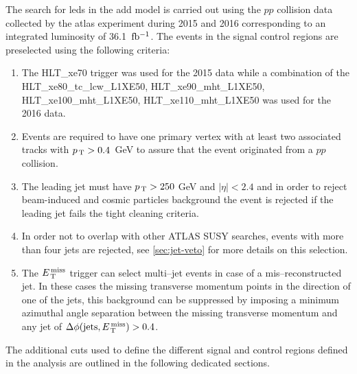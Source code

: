 The search for \glspl{led} in the \gls{add} model is carried out using the $pp$
collision data collected by the \gls{atlas} experiment during 2015 and 2016
corresponding to an integrated luminosity of 36.1~$\mbox{fb$^{-1}$}$. The events in the
signal control regions are preselected using the following criteria:
\begin{enumerate}[A -]
\item The HLT\_xe70 trigger was used for the 2015 data while a combination of
  the HLT\_xe80\_tc\_lcw\_L1XE50, HLT\_xe90\_mht\_L1XE50,
  HLT\_xe100\_mht\_L1XE50, HLT\_xe110\_mht\_L1XE50 was used for the 2016 data.
\item Events are required to have one primary vertex with at least two
  associated tracks with $p_\mathrm{\, T} > 0.4$~GeV to assure that the event originated
  from a $pp$ collision.
\item The leading jet must have $p_\mathrm{\, T} > 250~$GeV and $|\eta| < 2.4$ and in
  order to reject beam-induced and cosmic particles background the event is
  rejected if the leading jet fails the tight cleaning criteria.
\item In order not to overlap with other ATLAS SUSY searches, events with more
  than four jets are rejected, see \cref{sec:jet-veto} for more details on this
  selection.
\item The $E_\mathrm{\, T}^\mathrm{\, miss}$ trigger can select multi--jet events in case of a
  mis--reconstructed jet. In these cases the missing transverse momentum points
  in the direction of one of the jets, this background can be suppressed by
  imposing a minimum azimuthal angle separation between the missing transverse
  momentum and any jet of $\Delta \phi (\mathrm{jets}, E_\mathrm{\, T}^\mathrm{\, miss}) > 0.4$.
\end{enumerate}
The additional cuts used to define the different signal and control regions
defined in the analysis are outlined in the following dedicated sections.
